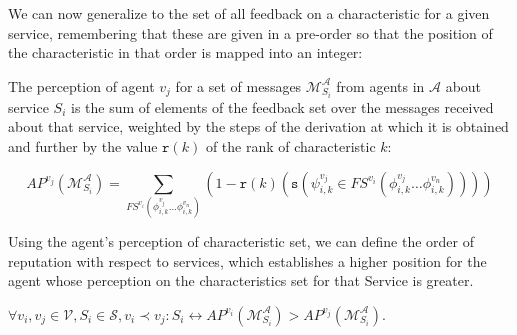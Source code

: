 \documentclass[]{llncs}
\begin{document}
We can now generalize to the set of all feedback on a characteristic for a given service, remembering that these are given in a pre-order so that the position of the characteristic in that order is mapped into an integer:


\begin{definition}
The perception of agent $v_{j}$ for a set of messages $\mathcal{M}^{\mathcal{A}}_{S_{i}}$ from agents in $\mathcal{A}$ about service $S_{i}$ 
is the sum of elements of the feedback set over the messages received about that service, weighted by the steps of the derivation at which it is obtained and further by the value $\mathtt{r}(k)$ of the rank of characteristic $k$: 

\[
AP^{v_{j}}(\mathcal{M}^{\mathcal{A}}_{S_{i}})=\sum_{FS^{v_{i}}(\phi^{v_{j}}_{i,k}\dots \phi^{v_{n}}_{i,k})}
(1-\mathtt{r}(k)
(\mathtt{s}(\psi^{v_{j}}_{i,k} \in FS^{v_{i}}(\phi^{v_{j}}_{i,k}\dots \phi^{v_{n}}_{i,k}))))
\]

\end{definition}


Using the agent's perception of characteristic set, we can define the order of reputation with respect to services, which establishes a higher position for the agent whose perception on the characteristics set for that Service is greater.

\begin{definition}[Reputation]
$\forall v_{i}, v_{j}\in \mathcal{V}, S_{i}\in \mathcal{S}, v_{i}\prec v_{j}:{S_{i}} \leftrightarrow AP^{v_{i}}(\mathcal{M}^{\mathcal{A}}_{S_{i}})>AP^{v_{j}}(\mathcal{M}^{\mathcal{A}}_{S_{i}})$.
\end{definition}
\end{document}

